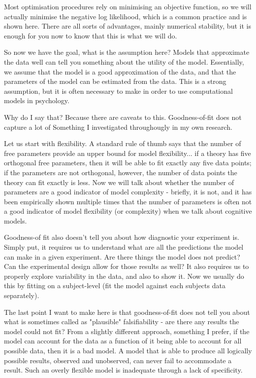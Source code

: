 \documentclass[12pt]{article}
\begin{document}
Most optimisation procedures rely on minimising an objective function, so we will actually minimise the negative log likelihood, which is a common practice and is shown here. There are all sorts of advantages, mainly numerical stability, but it is enough for you now to know that this is what we will do.

So now we have the goal, what is the assumption here? Models that approximate the data well can tell you something about the utility of the model. Essentially, we assume that the model is a good approximation of the data, and that the parameters of the model can be estimated from the data. This is a strong assumption, but it is often necessary to make in order to use computational models in psychology.

Why do I say that? Because there are caveats to this. Goodness-of-fit does not capture a lot of  Something I investigated throughougly in my own research.

Let us start with flexibility. A standard rule of thumb says that the number of free parameters provide an upper bound for model flexibility... if a theory has five orthogonal free parameters, then it will be able to fit exactly any five data points; if the parameters are not orthogonal, however, the number of data points the theory can fit exactly is less. Now we will talk about whether the number of parameters are a good indicator of model complexity - briefly, it is not, and it has been empirically shown multiple times that the number of parameters is often not a good indicator of model flexibility (or complexity) when we talk about cognitive models. 

Goodness-of fit also doesn't tell you about how diagnostic your experiment is. Simply put, it requires us to understand what are all the predictions the model can make in a given experiment. Are there things the model does not predict? Can the experimental design allow for those results as well? It also requires us to properly explore variability in the data, and also to show it. Now we usually do this by fitting on a subject-level (fit the model against each subjects data separately).

The last point I want to make here is that goodness-of-fit does not tell you about what is sometimes called as "plausible" falsifiability - are there any results the model could not fit? From a slightly different approach, something I prefer, if the model can account for the data as a function of it being able to account for all possible data, then it is a bad model. A model that is able to produce all logically possible results, observed and unobserved, can never fail to accommodate a result. Such an overly flexible model is inadequate through a lack of specificity.
\end{document}
